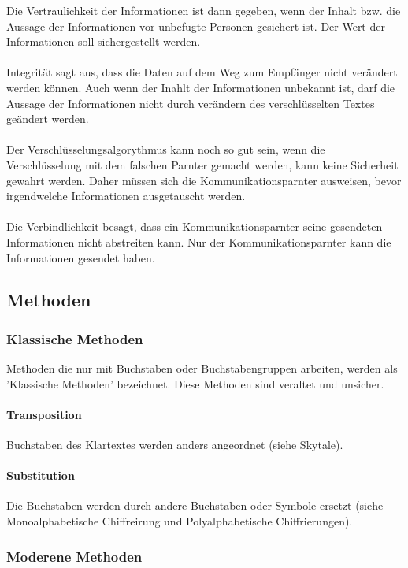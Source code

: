 \documentclass[12pt,a4paper]{report}
\begin{document}
Die Vertraulichkeit der Informationen ist dann gegeben, wenn der Inhalt bzw. die Aussage der Informationen vor unbefugte Personen gesichert ist. Der Wert der Informationen soll sichergestellt werden.\\\\
Integrität sagt aus, dass die Daten auf dem Weg zum Empfänger nicht verändert werden können. Auch wenn der Inahlt der Informationen unbekannt ist, darf die Aussage der Informationen nicht durch verändern des verschlüsselten Textes geändert werden.\\\\
Der Verschlüsselungsalgorythmus kann noch so gut sein, wenn die Verschlüsselung mit dem falschen Parnter gemacht werden, kann keine Sicherheit gewahrt werden. Daher müssen sich die Kommunikationsparnter ausweisen, bevor irgendwelche Informationen ausgetauscht werden.\\\\
Die Verbindlichkeit besagt, dass ein Kommunikationsparnter seine gesendeten Informationen nicht abstreiten kann. Nur der Kommunikationsparnter kann die Informationen gesendet haben.

\subsection{Methoden}

\subsubsection{Klassische Methoden}

Methoden die nur mit Buchstaben oder Buchstabengruppen arbeiten, werden als 'Klassische Methoden' bezeichnet. Diese Methoden sind veraltet und unsicher.

\paragraph{Transposition}

Buchstaben des Klartextes werden anders angeordnet (siehe Skytale).

\paragraph{Substitution}

Die Buchstaben werden durch andere Buchstaben oder Symbole ersetzt (siehe Monoalphabetische Chiffreirung und Polyalphabetische Chiffrierungen).

\subsubsection{Moderene Methoden}
\end{document}
